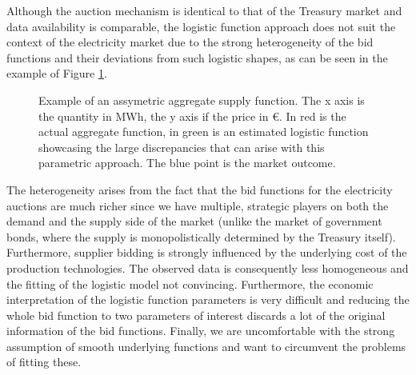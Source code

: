Although the auction mechanism is identical to that of the Treasury market and data availability is comparable, the logistic function approach does not suit the context of the electricity market due to the strong heterogeneity of the bid functions and their deviations from such logistic shapes, as can be seen in the example of Figure \ref{assymetry}. \\

\begin{figure}[!ht]
\begin{center}  \end{center}
\caption{Example of an assymetric aggregate supply function. The x axis is the quantity in MWh, the y axis if the price in €. In red is the actual aggregate function, in green is an estimated logistic function showcasing the large discrepancies that can arise with this parametric approach. The blue point is the market outcome. }
\label{assymetry}
\end{figure}

The heterogeneity arises from the fact that the bid functions for the electricity auctions are much richer since we have multiple, strategic players on both the demand and the supply side of the market (unlike the market of government bonds, where the supply is monopolistically determined by the Treasury itself). Furthermore, supplier bidding is strongly influenced by the underlying cost of the production technologies. The observed data is consequently less homogeneous and the fitting of the logistic model not convincing. Furthermore, the economic interpretation of the logistic function parameters is very difficult and reducing the whole bid function to two parameters of interest discards a lot of the original information of the bid functions. Finally, we are uncomfortable with the strong assumption of smooth underlying functions and want to circumvent the problems of fitting these.\\


